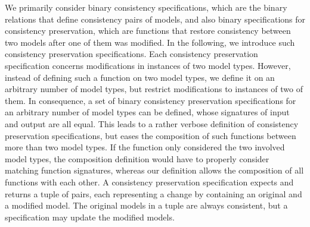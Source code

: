 We primarily consider binary consistency specifications, which are the binary relations that define consistency pairs of models, %
and also binary specifications for consistency preservation, which are functions that restore consistency between two models after one of them was modified. 
In the following, we introduce such consistency preservation specifications.
Each consistency preservation specification concerns modifications in instances of two model types.
However, instead of defining such a function on two model types, we define it on an arbitrary number of model types, but restrict modifications to instances of two of them.
In consequence, a set of binary consistency preservation specifications for an arbitrary number of model types can be defined, whose signatures of input and output are all equal.
This leads to a rather verbose definition of consistency preservation specifications, but eases the composition of such functions between more than two model types.
If the function only considered the two involved model types, the composition definition would have to properly consider matching function signatures, whereas our definition allows the composition of all functions with each other.
A consistency preservation specification expects and returns a tuple of pairs, each representing a change by containing an original and a modified model.
The original models in a tuple are always consistent, but a specification may update the modified models. %

